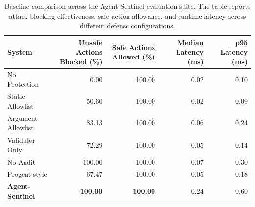 \begin{table}[t]
\centering
\small
\setlength{\tabcolsep}{7pt}
\caption{Baseline comparison across the Agent-Sentinel evaluation suite. The table reports attack blocking effectiveness, safe-action allowance, and runtime latency across different defense configurations.}
\label{tab:evaluation_results}
\begin{tabular}{lrrrr}
\toprule
System & Unsafe Actions Blocked (\%) & Safe Actions Allowed (\%) & Median Latency (ms) & p95 Latency (ms) \\
\midrule
No Protection & 0.00 & 100.00 & 0.02 & 0.10 \\
Static Allowlist & 50.60 & 100.00 & 0.02 & 0.09 \\
Argument Allowlist & 83.13 & 100.00 & 0.06 & 0.24 \\
Validator Only & 72.29 & 100.00 & 0.05 & 0.14 \\
No Audit & 100.00 & 100.00 & 0.07 & 0.30 \\
Progent-style & 67.47 & 100.00 & 0.05 & 0.18 \\
\textbf{Agent-Sentinel} & \textbf{100.00} & \textbf{100.00} & 0.24 & 0.60 \\
\bottomrule
\end{tabular}
\end{table}
